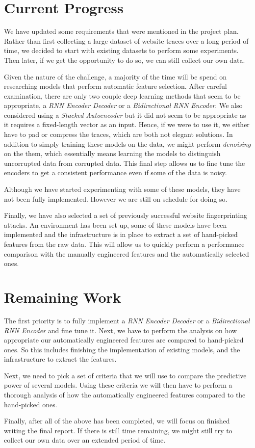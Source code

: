 \documentclass[10pt,a4paper]{article}
\begin{document}


\section{Current Progress}
We have updated some requirements that were mentioned in the project plan.
Rather than first collecting a large dataset of website traces over a long period of time,
we decided to start with existing datasets to perform some experiments. Then later, if we get the opportunity to do so, we can still collect our own data.

Given the nature of the challenge, a majority of the time will be spend on researching models that perform automatic feature selection.
After careful examination, there are only two couple deep learning methods that seem to be appropriate, a \textit{RNN Encoder Decoder} or a \textit{Bidirectional RNN Encoder}.
We also considered using a \textit{Stacked Autoencoder}  but it did not seem to be appropriate as it requires a fixed-length vector as an input.
Hence, if we were to use it, we either have to pad or compress the traces, which are both not elegant solutions.
In addition to simply training these models on the data, we might perform \textit{denoising} on the them, which essentially means learning the models to distinguish uncorrupted data from corrupted data.
This final step allows us to fine tune the encoders to get a consistent performance even if some of the data is noisy.

Although we have started experimenting with some of these models, they have not been fully implemented.
However we are still on schedule for doing so.

Finally, we have also selected a set of previously successful website fingerprinting attacks.
An environment has been set up, some of these models have been implemented and the infrastructure is in place to extract a set of hand-picked features from the raw data.
This will allow us to quickly perform a performance comparison with the manually engineered features and the automatically selected ones.

\section{Remaining Work}
The first priority is to fully implement a \textit{RNN Encoder Decoder} or a \textit{Bidirectional RNN Encoder} and fine tune it.
Next, we have to perform the analysis on how appropriate our automatically engineered features are compared to hand-picked ones.
So this includes finishing the implementation of existing models, and the infrastructure to extract the features.

Next, we need to pick a set of criteria that we will use to compare the predictive power of several models.
Using these criteria we will then have to perform a thorough analysis of how the automatically engineered features compared to the hand-picked ones.

Finally, after all of the above has been completed, we will focus on finished writing the final report.
If there is still time remaining, we might still try to collect our own data over an extended period of time.
\end{document}
